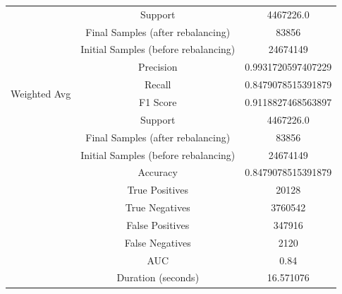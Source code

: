 \begin{longtable}{|c|c|c|}
 & Support & 4467226.0 \\
 & Final Samples (after rebalancing) & 83856 \\
 & Initial Samples (before rebalancing) & 24674149 \\
\hline
\multirow{4}{*}{Weighted Avg} & Precision & 0.9931720597407229 \\
 & Recall & 0.8479078515391879 \\
 & F1 Score & 0.9118827468563897 \\
 & Support & 4467226.0 \\
 & Final Samples (after rebalancing) & 83856 \\
 & Initial Samples (before rebalancing) & 24674149 \\
\hline
& Accuracy & 0.8479078515391879 \\ \hline
& True Positives & 20128 \\ \hline
& True Negatives & 3760542 \\ \hline
& False Positives & 347916 \\ \hline
& False Negatives & 2120 \\ \hline
& AUC & 0.84 \\ \hline
& Duration (seconds) & 16.571076 \\ \hline
\end{longtable}


